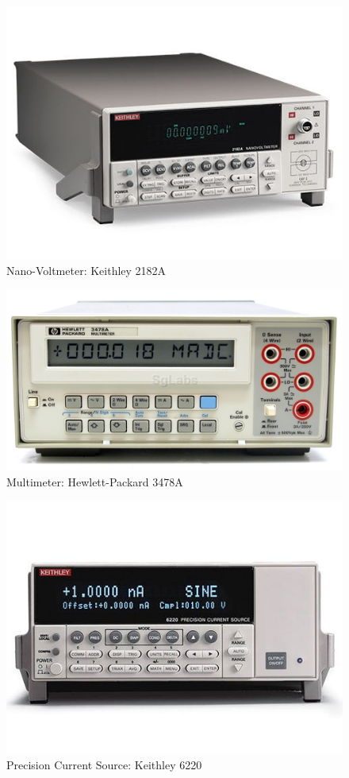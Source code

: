 \documentclass[12pt, titlepage]{article}
\begin{document}
\begin{figure}[H]
\centerline{\includegraphics[scale=0.5]{1.jpg}}
\caption{Nano-Voltmeter: Keithley 2182A}
\label{fig}
\end{figure}

\begin{figure}[H]
\centerline{\includegraphics[scale=1]{2.jpg}}
\caption{Multimeter: Hewlett-Packard 3478A}
\label{fig}
\end{figure}

\begin{figure}[H]
\centerline{\includegraphics[scale=0.5]{3.jpg}}
\caption{Precision Current Source: Keithley 6220}
\label{fig}
\end{figure}
\end{document}
